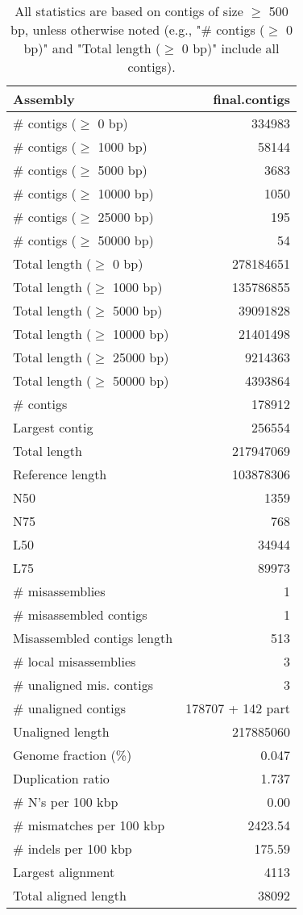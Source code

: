 \documentclass[12pt,a4paper]{article}
\begin{document}
\begin{table}[ht]
\begin{center}
\caption{All statistics are based on contigs of size $\geq$ 500 bp, unless otherwise noted (e.g., "\# contigs ($\geq$ 0 bp)" and "Total length ($\geq$ 0 bp)" include all contigs).}
\begin{tabular}{|l*{1}{|r}|}
\hline
Assembly & final.contigs \\ \hline
\# contigs ($\geq$ 0 bp) & 334983 \\ \hline
\# contigs ($\geq$ 1000 bp) & 58144 \\ \hline
\# contigs ($\geq$ 5000 bp) & 3683 \\ \hline
\# contigs ($\geq$ 10000 bp) & 1050 \\ \hline
\# contigs ($\geq$ 25000 bp) & 195 \\ \hline
\# contigs ($\geq$ 50000 bp) & 54 \\ \hline
Total length ($\geq$ 0 bp) & 278184651 \\ \hline
Total length ($\geq$ 1000 bp) & 135786855 \\ \hline
Total length ($\geq$ 5000 bp) & 39091828 \\ \hline
Total length ($\geq$ 10000 bp) & 21401498 \\ \hline
Total length ($\geq$ 25000 bp) & 9214363 \\ \hline
Total length ($\geq$ 50000 bp) & 4393864 \\ \hline
\# contigs & 178912 \\ \hline
Largest contig & 256554 \\ \hline
Total length & 217947069 \\ \hline
Reference length & 103878306 \\ \hline
N50 & 1359 \\ \hline
N75 & 768 \\ \hline
L50 & 34944 \\ \hline
L75 & 89973 \\ \hline
\# misassemblies & 1 \\ \hline
\# misassembled contigs & 1 \\ \hline
Misassembled contigs length & 513 \\ \hline
\# local misassemblies & 3 \\ \hline
\# unaligned mis. contigs & 3 \\ \hline
\# unaligned contigs & 178707 + 142 part \\ \hline
Unaligned length & 217885060 \\ \hline
Genome fraction (\%) & 0.047 \\ \hline
Duplication ratio & 1.737 \\ \hline
\# N's per 100 kbp & 0.00 \\ \hline
\# mismatches per 100 kbp & 2423.54 \\ \hline
\# indels per 100 kbp & 175.59 \\ \hline
Largest alignment & 4113 \\ \hline
Total aligned length & 38092 \\ \hline
\end{tabular}
\end{center}
\end{table}
\end{document}
